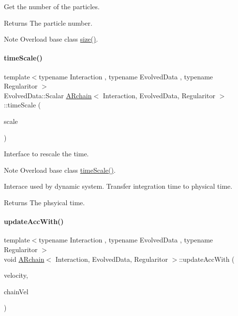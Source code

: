 Get the number of the particles. 

\begin{DoxyReturn}{Returns}
The particle number. 
\end{DoxyReturn}
\begin{DoxyNote}{Note}
Overload base class \mbox{\hyperlink{class_a_rchain_ac612af46ce057d56dc47a6d28738a4cf}{size()}}. 
\end{DoxyNote}
\mbox{\label{class_a_rchain_a979a40abd086aeb411dc8e82a3bb1cdf}} 
\paragraph{\texorpdfstring{time\+Scale()}{timeScale()}}
{\footnotesize\ttfamily template$<$typename Interaction , typename Evolved\+Data , typename Regularitor $>$ \\
Evolved\+Data\+::\+Scalar \mbox{\hyperlink{class_a_rchain}{A\+Rchain}}$<$ Interaction, Evolved\+Data, Regularitor $>$\+::time\+Scale (\begin{DoxyParamCaption}\item[{\mbox{\hyperlink{class_a_rchain_a707e42a79e4744424a34c9007e84ee07}{Scalar}}}]{scale }\end{DoxyParamCaption})}



Interface to rescale the time. 

\begin{DoxyNote}{Note}
Overload base class \mbox{\hyperlink{class_a_rchain_a979a40abd086aeb411dc8e82a3bb1cdf}{time\+Scale()}}.
\end{DoxyNote}
Interace used by dynamic system. Transfer integration time to physical time. \begin{DoxyReturn}{Returns}
The phsyical time. 
\end{DoxyReturn}
\mbox{\label{class_a_rchain_a92865bff07dc16e3065a8f695120a5f5}} 
\paragraph{\texorpdfstring{update\+Acc\+With()}{updateAccWith()}}
{\footnotesize\ttfamily template$<$typename Interaction , typename Evolved\+Data , typename Regularitor $>$ \\
void \mbox{\hyperlink{class_a_rchain}{A\+Rchain}}$<$ Interaction, Evolved\+Data, Regularitor $>$\+::update\+Acc\+With (\begin{DoxyParamCaption}\item[{\mbox{\hyperlink{class_a_rchain_a019fbadb9f4e5892736d9127537338bb}{Vector\+Array}} \&}]{velocity,  }\item[{\mbox{\hyperlink{class_a_rchain_a019fbadb9f4e5892736d9127537338bb}{Vector\+Array}} \&}]{chain\+Vel }\end{DoxyParamCaption})\hspace{0.3cm}{\ttfamily [private]}}



